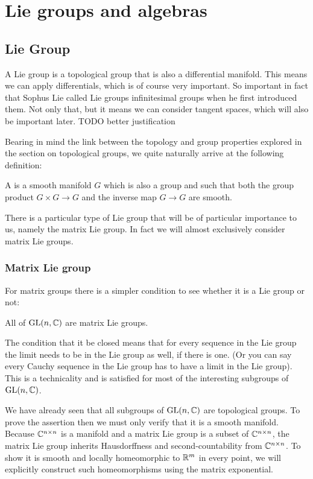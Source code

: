 \chapter{Lie groups and algebras}

\section{Lie Group}
A Lie group is a topological group that is also a differential manifold. This means we can apply differentials, which is of course very important. So important in fact that Sophus Lie called Lie groups infinitesimal groups when he first introduced them. Not only that, but it means we can consider tangent spaces, which will also be important later. TODO better justification

Bearing in mind the link between the topology and group properties explored in the section on topological groups, we quite naturally arrive at the following definition:
\begin{definition}
A  is a smooth manifold $G$ which is also a group and such that both the group product $G\times G \to G$ and the inverse map $G \to G$ are smooth.
\end{definition}

There is a particular type of Lie group that will be of particular importance to us, namely the matrix Lie group. In fact we will almost exclusively consider matrix Lie groups.

\subsection{Matrix Lie group}
For matrix groups there is a simpler condition to see whether it is a Lie group or not:
\begin{eigenschap}
All  of $\operatorname{GL}(n, \mathbb{C})$ are matrix Lie groups.
\end{eigenschap}
The condition that it be closed means that for every sequence in the Lie group the limit needs to be in the Lie group as well, if there is one. (Or you can say every Cauchy sequence in the Lie group has to have a limit in the Lie group). This is a technicality and is satisfied for most of the interesting subgroups of $\operatorname{GL}(n, \mathbb{C})$. 

We have already seen that all subgroups of $\operatorname{GL}(n, \mathbb{C})$ are topological groups. To prove the assertion then we must only verify that it is a smooth manifold. Because $\mathbb{C}^{n\times n}$ is a manifold and a matrix Lie group is a subset of $\mathbb{C}^{n\times n}$, the matrix Lie group inherits Hausdorffness and second-countability from $\mathbb{C}^{n\times n}$. To show it is smooth and locally homeomorphic to $\mathbb{R}^{m}$ in every point, we will explicitly construct such homeomorphisms using the matrix exponential.

